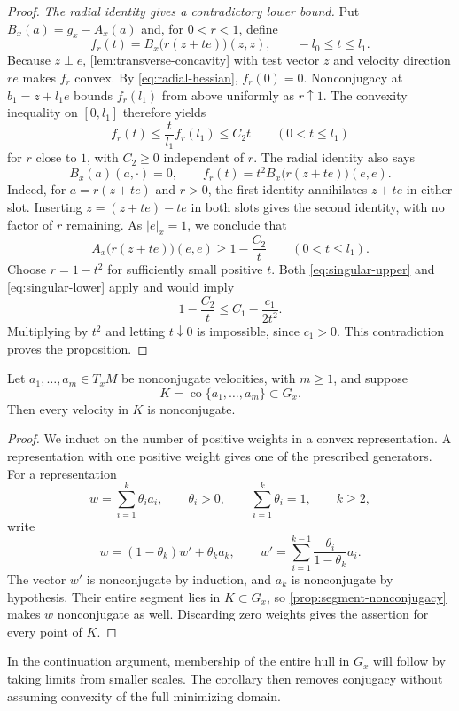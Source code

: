 \begin{proof}
\medskip\noindent
\emph{The radial identity gives a contradictory lower bound.}
Put $B_x(a)=g_x-A_x(a)$ and, for $0<r<1$, define
\[
 f_r(t)=B_x\bigl(r(z+te)\bigr)(z,z),
 \qquad -l_0\leq t\leq l_1.
\]
Because $z\perp e$, \cref{lem:transverse-concavity} with test
vector $z$ and velocity direction $re$ makes $f_r$ convex.
By \eqref{eq:radial-hessian}, $f_r(0)=0$.
Nonconjugacy at $b_1=z+l_1e$ bounds $f_r(l_1)$ from above
uniformly as $r\uparrow1$.  The convexity inequality on $[0,l_1]$
therefore yields
\[
 f_r(t)\leq\frac{t}{l_1}f_r(l_1)\leq C_2t
 \qquad(0<t\leq l_1)
\]
for $r$ close to $1$, with $C_2\geq0$ independent of $r$.
The radial identity also says
\begin{equation}
 B_x(a)(a,\cdot)=0,
 \qquad
 f_r(t)=t^2B_x\bigl(r(z+te)\bigr)(e,e).
 \label{eq:radial-null}
\end{equation}
Indeed, for $a=r(z+te)$ and $r>0$, the first identity annihilates
$z+te$ in either slot.  Inserting $z=(z+te)-te$ in both slots
gives the second identity, with no factor of $r$ remaining.
As $|e|_x=1$, we conclude that
\begin{equation}
 A_x\bigl(r(z+te)\bigr)(e,e)\geq1-\frac{C_2}{t}
 \qquad(0<t\leq l_1).
 \label{eq:singular-lower}
\end{equation}
Choose $r=1-t^2$ for sufficiently small positive $t$.  Both
\eqref{eq:singular-upper} and \eqref{eq:singular-lower} apply and
would imply
\[
 1-\frac{C_2}{t}\leq C_1-\frac{c_1}{2t^2}.
\]
Multiplying by $t^2$ and letting $t\downarrow0$ is impossible,
since $c_1>0$.  This contradiction proves the proposition.
\end{proof}


\begin{corollary}
\label{geo:first-cut}
Let $a_1,\ldots,a_m\in T_xM$ be nonconjugate velocities, with $m\geq1$,
and suppose
\[
 K=\operatorname{co}\{a_1,\ldots,a_m\}\subset G_x.
\]
Then every velocity in $K$ is nonconjugate.
\end{corollary}

\begin{proof}
We induct on the number of positive weights in a convex representation.
A representation with one positive weight gives one of the prescribed
generators. For a representation
\[
 w=\sum_{i=1}^k\theta_i a_i,\qquad
 \theta_i>0,\qquad \sum_{i=1}^k\theta_i=1,\qquad k\geq2,
\]
write
\[
 w=(1-\theta_k)w'+\theta_k a_k,\qquad
 w'=\sum_{i=1}^{k-1}\frac{\theta_i}{1-\theta_k}a_i.
\]
The vector $w'$ is nonconjugate by induction, and $a_k$ is
nonconjugate by hypothesis. Their entire segment lies in $K\subset G_x$,
so \cref{prop:segment-nonconjugacy} makes $w$ nonconjugate as well.
Discarding zero weights gives the assertion for every point of $K$.
\end{proof}

In the continuation argument, membership of the entire hull in $G_x$
will follow by taking limits from smaller scales. The corollary then
removes conjugacy without assuming convexity of the full minimizing
domain.
